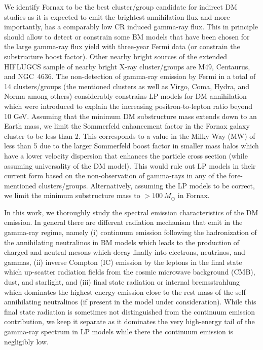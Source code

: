 \documentclass[10pt,aps,pra,reprint,amsmath,amsfonts,amssymb,showpacs,nofootinbib,floatfix]{revtex4-1}
\newcommand{\msun}{M_\odot}
\begin{document}
We identify Fornax to be the best cluster/group candidate for indirect
DM studies as it is expected to emit the brightest annihilation flux
and more importantly, has a comparably low CR induced gamma-ray flux.
This in principle should allow to detect or constrain some BM models
that have been chosen for the large gamma-ray flux yield with
three-year Fermi data (or constrain the substructure boost
factor). Other nearby bright sources of the extended HIFLUGCS sample
of nearby bright X-ray cluster/groups are M49, Centaurus, and
NGC~4636.  The non-detection of gamma-ray emission by Fermi in a total
of 14 clusters/groups (the mentioned clusters as well as Virgo, Coma,
Hydra, and Norma among others) considerably constrains LP models for
DM annihilation which were introduced to explain the increasing
positron-to-lepton ratio beyond 10 GeV. Assuming that the minimum DM
substructure mass extends down to an Earth mass, we limit the
Sommerfeld enhancement factor in the Fornax galaxy cluster to be less
than 2. This corresponds to a value in the Milky Way (MW) of less than
5 due to the larger Sommerfeld boost factor in smaller mass halos
which have a lower velocity dispersion that enhances the particle
cross section (while assuming universality of the DM model). This
would rule out LP models in their current form based on the
non-observation of gamma-rays in any of the fore-mentioned
clusters/groups. Alternatively, assuming the LP models to be correct,
we limit the minimum substructure mass to $>100~\msun$ in Fornax.

In this work, we thoroughly study the spectral emission
characteristics of the DM emission. In general there are different
radiation mechanism that emit in the gamma-ray regime, namely (i)
continuum emission following the hadronization of the annihilating
neutralinos in BM models which leads to the production of charged and
neutral mesons which decay finally into electrons, neutrinos, and
gammas, (ii) inverse Compton (IC) emission by the leptons in the final
state which up-scatter radiation fields from the cosmic microwave
background (CMB), dust, and starlight, and (iii) final state radiation
or internal bremsstrahlung which dominates the highest energy emission
close to the rest mass of the self-annihilating neutralinos (if
present in the model under consideration). While this final state
radiation is sometimes not distinguished from the continuum emission
contribution, we keep it separate as it dominates the very high-energy
tail of the gamma-ray spectrum in LP models while there the continuum
emission is negligibly low.
\end{document}
